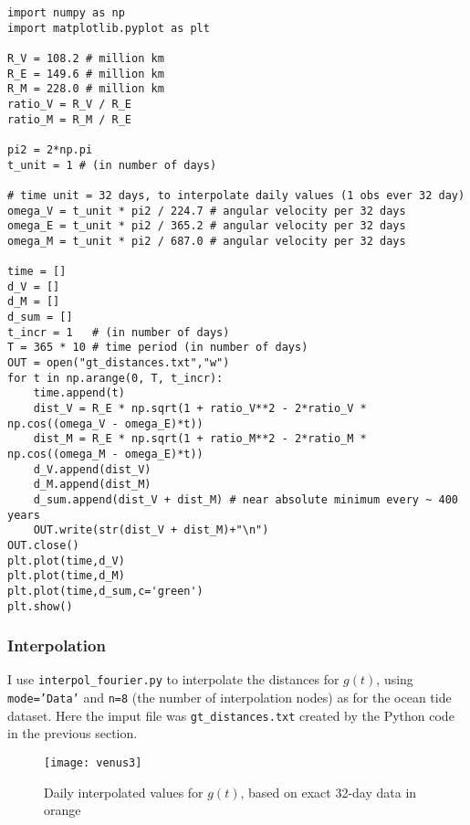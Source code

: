 \documentclass[oneside,10pt]{book}
\begin{document}
\begin{lstlisting}
import numpy as np
import matplotlib.pyplot as plt

R_V = 108.2 # million km
R_E = 149.6 # million km
R_M = 228.0 # million km
ratio_V = R_V / R_E
ratio_M = R_M / R_E

pi2 = 2*np.pi
t_unit = 1 # (in number of days)

# time unit = 32 days, to interpolate daily values (1 obs ever 32 day)
omega_V = t_unit * pi2 / 224.7 # angular velocity per 32 days
omega_E = t_unit * pi2 / 365.2 # angular velocity per 32 days
omega_M = t_unit * pi2 / 687.0 # angular velocity per 32 days

time = []
d_V = []
d_M = []
d_sum = []
t_incr = 1   # (in number of days)
T = 365 * 10 # time period (in number of days)
OUT = open("gt_distances.txt","w")
for t in np.arange(0, T, t_incr):
    time.append(t)
    dist_V = R_E * np.sqrt(1 + ratio_V**2 - 2*ratio_V * np.cos((omega_V - omega_E)*t))
    dist_M = R_E * np.sqrt(1 + ratio_M**2 - 2*ratio_M * np.cos((omega_M - omega_E)*t))
    d_V.append(dist_V) 
    d_M.append(dist_M)
    d_sum.append(dist_V + dist_M) # near absolute minimum every ~ 400 years
    OUT.write(str(dist_V + dist_M)+"\n")
OUT.close()
plt.plot(time,d_V)
plt.plot(time,d_M)
plt.plot(time,d_sum,c='green')
plt.show()
\end{lstlisting}

\subsubsection{Interpolation} 


I use  \texttt{interpol\_fourier.py} to interpolate the distances for $g(t)$, using \texttt{mode='Data'} and \texttt{n=8} (the number of interpolation nodes) as for
 the ocean tide dataset. Here the imput file was \texttt{gt\_distances.txt} created by the Python code in the previous section. 


\begin{figure}[H]
\centering
\texttt{[image: venus3]} %
\caption{Daily interpolated values for $g(t)$, based on exact 32-day data in orange}
\label{fig:venus3}
\end{figure}
\end{document}
